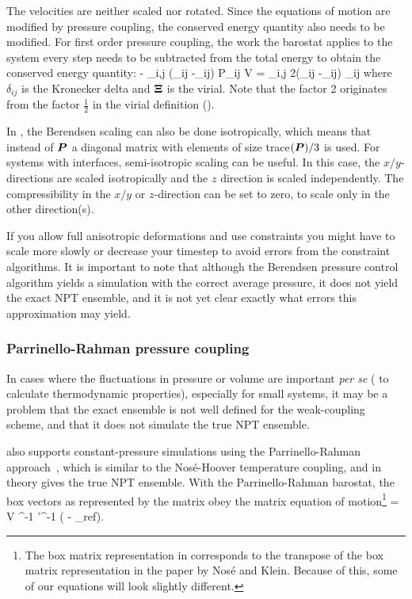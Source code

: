 \eeq
The velocities are neither scaled nor rotated.
Since the equations of motion are modified by pressure coupling, the conserved
energy quantity also needs to be modified. For first order pressure coupling,
the work the barostat applies to the system every step needs to
be subtracted from the total energy to obtain the conserved energy quantity:
\beq
- \sum_{i,j} (\mu_{ij} -\delta_{ij}) P_{ij} V =
\sum_{i,j} 2(\mu_{ij} -\delta_{ij}) \Xi_{ij}
\eeq
where $\delta_{ij}$ is the Kronecker delta and  ${\bf \Xi}$ is the virial.
Note that the factor 2 originates from the factor $\frac{1}{2}$
in the virial definition ().


In {\gromacs}, the Berendsen scaling can also be done isotropically, 
which means that instead of $\ve{P}$ a diagonal matrix with elements of size
trace$(\ve{P})/3$ is used. For systems with interfaces, semi-isotropic 
scaling can be useful.
In this case, the $x/y$-directions are scaled isotropically and the $z$
direction is scaled independently. The compressibility in the $x/y$ or
$z$-direction can be set to zero, to scale only in the other direction(s).

If you allow full anisotropic deformations and use constraints you
might have to scale more slowly or decrease your timestep to avoid
errors from the constraint algorithms.  It is important to note that
although the Berendsen pressure control algorithm yields a simulation
with the correct average pressure, it does not yield the exact NPT
ensemble, and it is not yet clear exactly what errors this approximation
may yield.

\subsubsection{Parrinello-Rahman pressure coupling}

In cases where the fluctuations in pressure or volume are important
{\em per se} ({\eg} to calculate thermodynamic properties), especially
for small systems, it may be a problem that the exact ensemble is not
well defined for the weak-coupling scheme, and that it does not
simulate the true NPT ensemble.

{\gromacs} also supports constant-pressure simulations using the
Parrinello-Rahman approach~\cite{Parrinello81,Nose83}, which is similar
to the Nos{\'e}-Hoover temperature coupling, and in theory gives the
true NPT ensemble.  With the Parrinello-Rahman barostat, the box
vectors as represented by the matrix  obey the matrix equation
of motion\footnote{The box matrix representation  in {\gromacs}
corresponds to the transpose of the box matrix representation 
in the paper by Nos{\'e} and Klein. Because of this, some of our
equations will look slightly different.}
\beq
{}= V ^{-1} '^{-1} \left(  - _{ref}\right).
\eeq


